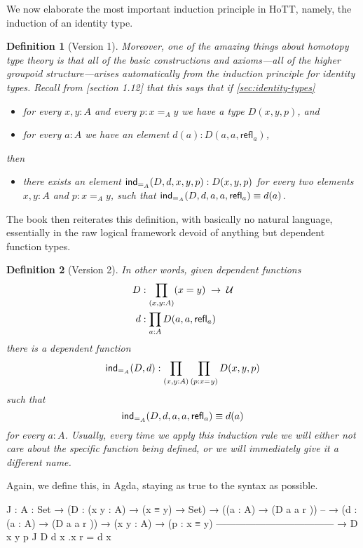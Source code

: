 \documentclass[11pt, a4paper]{article}
\newtheorem{definition}{Definition} \newtheorem{lem}{Lemma}
\newcommand{\jdeq}{\equiv} %
\newcommand{\refl}[1]{\ensuremath{\mathsf{refl}_{#1}}\xspace}
\newcommand{\id}[3][]{\ensuremath{#2 =_{#1} #3}\xspace}
\begin{document}
We now elaborate the most important induction principle in HoTT, namely, the
induction of an identity type.

\begin{definition}[Version 1]

Moreover, one of the amazing things about homotopy type theory is that all of
the basic constructions and axioms---all of the higher groupoid
structure---arises automatically from the induction principle for identity
types. Recall from [section 1.12] that this says that if %
\cref{sec:identity-types}
  \begin{itemize}[noitemsep]
    \item for every $x,y:A$ and every $p:\id[A]xy$ we have a type $D(x,y,p)$,
and
    \item for every $a:A$ we have an element $d(a):D(a,a,\refl a)$,
  \end{itemize} then
  \begin{itemize}[noitemsep]
    \item there exists an element $\mathsf{ind}_{=_{A}}(D,d,x,y,p):D(x,y,p)$ for
\emph{every} two elements $x,y:A$ and $p:\id[A]xy$, such that
$\indid{A}(D,d,a,a,\refl a) \jdeq d(a)$.
  \end{itemize}
\end{definition} The book then reiterates this definition, with basically no
natural language, essentially in the raw logical framework devoid of anything
but dependent function types.
\begin{definition}[Version 2] In other words, given dependent functions
\begin{align*} D & :\prod_{(x,y:A)}(x= y) \; \to \; \type\\ d & :\prod_{a:A}
D(a,a,\refl{a})
\end{align*} there is a dependent function
\[\indid{A}(D,d):\prod_{(x,y:A)}\prod_{(p:\id{x}{y})} D(x,y,p)\] such that
\begin{equation}\label{eq:Jconv} \indid{A}(D,d,a,a,\refl{a})\jdeq d(a)
\end{equation} for every $a:A$. Usually, every time we apply this induction rule
we will either not care about the specific function being defined, or we will
immediately give it a different name.

\end{definition} Again, we define this, in Agda, staying as true to the syntax
as possible.
\begin{code}

  J : {A : Set} → (D : (x y : A) → (x ≡ y) → Set) → ((a : A) → (D a a r )) -- →
(d : (a : A) → (D a a r )) → (x y : A) → (p : x ≡ y)
------------------------------------ → D x y p J D d x .x r = d x

\end{code}
\end{document}
